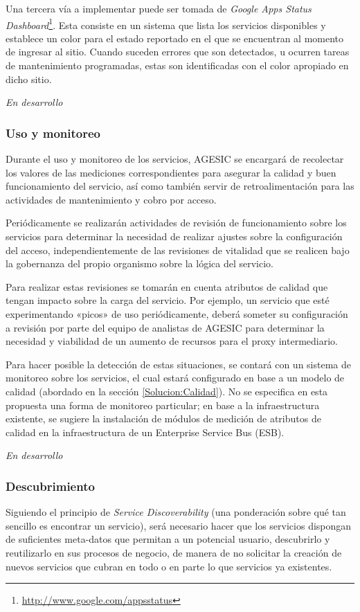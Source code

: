       Una tercera vía a implementar puede ser tomada de \emph{Google Apps Status Dashboard}\footnote{\url{http://www.google.com/appsstatus}}. Esta consiste en un sistema que lista los servicios disponibles y establece un color para el estado reportado en el que se encuentran al momento de ingresar al sitio. Cuando suceden errores que son detectados, u ocurren tareas de mantenimiento programadas, estas son identificadas con el color apropiado en dicho sitio.

      \emph{En desarrollo}

    \subsubsection{Uso y monitoreo}
      Durante el uso y monitoreo de los servicios, AGESIC se encargará de recolectar los valores de las mediciones correspondientes para asegurar la calidad y buen funcionamiento del servicio, así como también servir de retroalimentación para las actividades de mantenimiento y cobro por acceso.

      Periódicamente se realizarán actividades de revisión de funcionamiento sobre los servicios para determinar la necesidad de realizar ajustes sobre la configuración del acceso, independientemente de las revisiones de vitalidad que se realicen bajo la gobernanza del propio organismo sobre la lógica del servicio.

      Para realizar estas revisiones se tomarán en cuenta atributos de calidad que tengan impacto sobre la carga del servicio. Por ejemplo, un servicio que esté experimentando «picos» de uso periódicamente, deberá someter su configuración a revisión por parte del equipo de analistas de AGESIC para determinar la necesidad y viabilidad de un aumento de recursos para el proxy intermediario.

      Para hacer posible la detección de estas situaciones, se contará con un sistema de monitoreo sobre los servicios, el cual estará configurado en base a un modelo de calidad (abordado en la sección \ref{Solucion:Calidad}). No se especifica en esta propuesta una forma de monitoreo particular; en base a la infraestructura existente, se sugiere la instalación de módulos de medición de atributos de calidad en la infraestructura de un Enterprise Service Bus (ESB).

      \emph{En desarrollo}

    \subsubsection{Descubrimiento}
      Siguiendo el principio de \emph{Service Discoverability} (una ponderación sobre qué tan sencillo es encontrar un servicio), será necesario hacer que los servicios dispongan de suficientes meta-datos que permitan a un potencial usuario, descubrirlo y reutilizarlo en sus procesos de negocio, de manera de no solicitar la creación de nuevos servicios que cubran en todo o en parte lo que servicios ya existentes.

